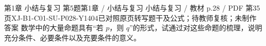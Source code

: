 \par\noindent\begin{minipage}{\linewidth}
\begin{bankitem}{第1章 小结与复习 第5题}{第1章 / 小结与复习 小结与复习 / 教材 p.28 / PDF 第35页}{XJ-B1-C01-SU-P028-Y1404}{已对照原页转写题干及公式；待教师复核；未制作答案}
数学中的大量命题具有“若 $p$，则 $q$”的形式，试通过对这些命题的梳理，说明充分条件、必要条件以及充要条件的意义。
\end{bankitem}
\end{minipage}\par\medskip
